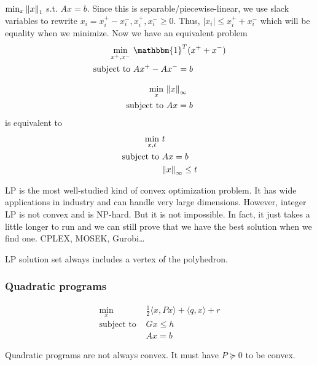 \documentclass[class=article,crop=false]{standalone}
\begin{document}
\begin{eg}
$ \min_x {\left\lVert{ x}\right\rVert}_1 $ s.t. $ Ax=b$. Since this is separable/piecewise-linear, we use slack variables to rewrite $ x_i = x_i^{+} - x_i^{-}, x_i^{+}, x_i^{-}\geq 0$. Thus, $ |x_i| \leq x_i^{+}+ x_i^{-}$ which will be equality when we minimize. Now we have an equivalent problem
\begin{align*}
	\min_{x^{+}, x^{-}}\ & \mathbbm{1}^{T}(x^{+}+ x^{-}) \\
\text{subject to } &Ax^{+}-Ax^{-} =b
\end{align*}
\end{eg}
\begin{eg}
\begin{align*}
\min_x\ & {\left\lVert{ x}\right\rVert}_{\infty}  \\
\text{subject to } &Ax=b
\end{align*}
is equivalent to
\begin{align*}
	\min_{x,t}\ & t\\
	\text{subject to } &Ax=b\\
		&{\left\lVert{ x}\right\rVert}_{\infty} \leq t
\end{align*}
\end{eg}
\begin{remark}
	LP is the most well-studied kind of convex optimization problem. It has wide applications in industry and can handle very large dimensions. However, integer LP is not convex and is NP-hard. But it is not impossible. In fact, it just takes a little longer to run and we can still prove that we have the best solution when we find one. CPLEX, MOSEK, Gurobi\ldots 
\end{remark}


\begin{thm}
LP solution set always includes a vertex of the polyhedron.
\end{thm}

\subsubsection{Quadratic programs}

\begin{align*}
\min_x\ & \frac{1}{2} \langle x,Px \rangle + \langle q,x \rangle + r \\
\text{subject to } &Gx \leq h \\
&Ax = b
\end{align*}
\begin{note}
Quadratic programs are not always convex. It must have $ P \succeq 0$ to be convex.
\end{note}
\end{document}
